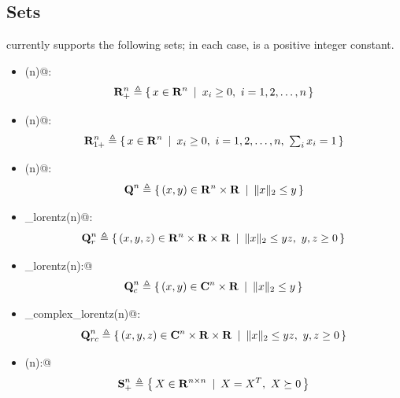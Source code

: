 \documentclass[12pt]{article}
\newcommand{\symm}{{\mbox{\bf S}}}  %
\newcommand{\lorentz}{{\mbox{\bf Q}}}  %
\begin{document}

\subsection{Sets}

\cvx currently supports the following sets; in each case, \verb@n@ is a positive
integer constant.
\begin{itemize}
\item \verb@nonnegative(n)@:
\begin{equation*}
	\mathbf{R}^n_+ \triangleq \left\{\,x\in\mathbf{R}^{n}\,~|~\,x_i\geq 0,~i=1,2,\dots,n\,\right\}
\end{equation*}	
\item \verb@simplex(n)@:
\begin{equation*}
	\mathbf{R}^n_{1+} \triangleq \left\{\,x\in\mathbf{R}^{n}\,~|~\,x_i\geq 0,~i=1,2,\dots,n,~\textstyle\sum_ix_i=1\,\right\}
\end{equation*}	
\item \verb@lorentz(n)@:
\begin{equation*}
\lorentz^n \eqbydef \Condset{(x,y)\in\R^n\times\R}{\|x\|_2\leq y}
\end{equation*}
\item \verb@rotated_lorentz(n)@: 
\begin{equation*}
\lorentz^n_r \eqbydef \Condset{(x,y,z)\in\R^n\times\R\times\R}{\|x\|_2\leq yz,~y,z\geq 0}
\end{equation*}
\item \verb@complex_lorentz(n):@ 
\begin{equation*}
\lorentz^n_c \eqbydef \Condset{(x,y)\in\complex^n\times\R}{\|x\|_2\leq y}
\end{equation*}
\item \verb@rotated_complex_lorentz(n)@: 
\begin{equation*}
\lorentz^n_{rc} \eqbydef \Condset{(x,y,z)\in\complex^n\times\R\times\R}{\|x\|_2\leq yz,~y,z\geq 0}
\end{equation*}
\item \verb@semidefinite(n):@ 
\begin{equation*}
\symm^n_+ \eqbydef \Condset{X\in\R^{n\times n}}{X=X^T,~X\succeq 0}
\end{equation*}

\end{itemize}
\end{document}
